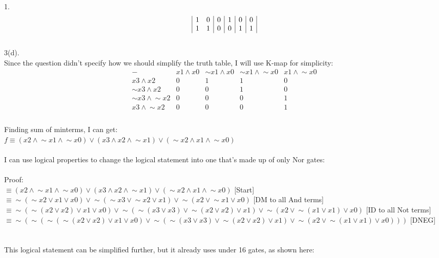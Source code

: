 \documentclass[a4paper, 20pt]{article}
\def\lnot{\mathop{\sim}}
\begin{document}
\begin{question}{1.}
\begin{displaymath}
\begin{array}{|c c|c|c|c|c|}
1 & 0 & 0 & 1 & 0 & 0\\
1 & 1 & 0 & 0 & 1 & 1\\
\end{array}
\end{displaymath}
\\3(d).
\\ Since the question didn't specify how we should simplify the truth table, I will use K-map for simplicity:
\begin{displaymath}
\begin{array}{|c|c|c|c|c|}
- & x1 \land x0 & \lnot x1 \land x0 & \lnot x1 \land \lnot x0 & x1 \land \lnot x0 \\
\hline 
x3 \land x2 & 0&1&1&0\\
\lnot x3 \land x2 & 0&0&1&0\\
\lnot x3 \land \lnot x2 & 0&0&0&1\\
x3 \land \lnot x2 & 0&0&0&1\\
\end{array}
\end{displaymath}
\\ Finding sum of minterms, I can get:
\\ $f \equiv (x2 \land \lnot x1 \land \lnot x0) \lor (x3 \land x2 \land \lnot x1) \lor (\lnot x2 \land x1 \land \lnot x0)$
\\
\\ I can use logical properties to change the logical statement into one that's made up of only Nor gates:
\\
\\ Proof:
\\ $\equiv (x2 \land \lnot x1 \land \lnot x0) \lor (x3 \land x2 \land \lnot x1) \lor (\lnot x2 \land x1 \land \lnot x0)$ [Start]
\\ $\equiv \lnot (\lnot x2 \lor x1 \lor x0) \lor \lnot (\lnot x3 \lor \lnot x2 \lor x1) \lor \lnot (x2 \lor \lnot x1 \lor x0)$ [DM to all And terms]
\\ $\equiv \lnot (\lnot (x2 \lor x2) \lor x1 \lor x0) \lor \lnot (\lnot (x3 \lor x3) \lor \lnot (x2 \lor x2) \lor x1) \lor \lnot (x2 \lor \lnot (x1 \lor x1) \lor x0)$ [ID to all Not terms]
\\ $\equiv \lnot (\lnot (\lnot (\lnot (x2 \lor x2) \lor x1 \lor x0) \lor \lnot (\lnot (x3 \lor x3) \lor \lnot (x2 \lor x2) \lor x1) \lor \lnot (x2 \lor \lnot (x1 \lor x1) \lor x0)))$ [DNEG]
\\ \boxed{}
\\
\\ This logical statement can be simplified further, but it already uses under 16 gates, as shown here:

\end{question}
\end{document}
